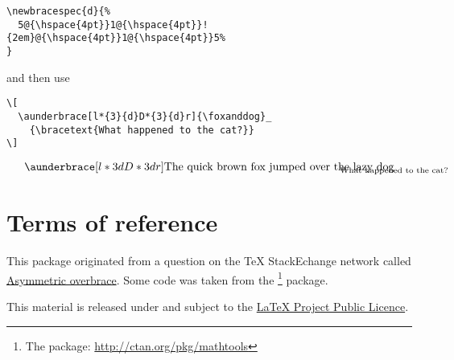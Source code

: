 \documentclass{ltxdockit}[2011/03/25]
\begin{document}
\begin{lstlisting}
\newbracespec{d}{%
  5@{\hspace{4pt}}1@{\hspace{4pt}}!{2em}@{\hspace{4pt}}1@{\hspace{4pt}}5%
}
\end{lstlisting}

\noindent and then use

\begin{lstlisting}
\[
  \aunderbrace[l*{3}{d}D*{3}{d}r]{\foxanddog}_
    {\bracetext{What happened to the cat?}}
\]
\end{lstlisting}


\[ \aunderbrace[l*{3}{d}D*{3}{d}r]{\foxanddog}_{\bracetext{What happened to the cat?}} \]

\section{Terms of reference}

This package originated from a question on the TeX StackEchange network called \href{http://tex.stackexchange.com/q/68526/5764}{Asymmetric overbrace}. Some code was taken from the \footnote{The  package: \url{http://ctan.org/pkg/mathtools}} package.

This material is released under and subject to the \href{http://www.ctan.org/tex-archive/help/Catalogue/licenses.lppl.html}{LaTeX Project Public Licence}.
\end{document}
